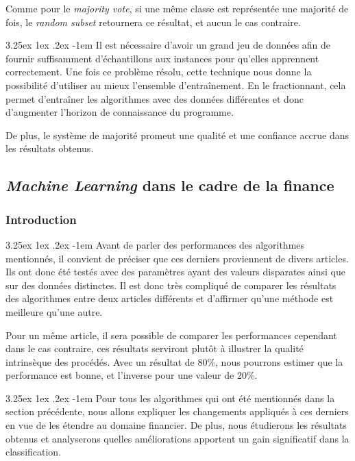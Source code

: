 \documentclass[a4paper, 11pt]{article}
\makeatletter
\renewcommand\paragraph{\@startsection{paragraph}{5}{\z@}%
  {3.25ex \@plus1ex \@minus.2ex}%
  {-1em}%
  {\normalfont\normalsize\bfseries}}
\makeatother
\begin{document}
Comme pour le \textit{majority vote}, si une même classe est représentée une majorité de fois, le \textit{random subset} retournera ce résultat, et aucun le cas contraire.

\paragraph{}
Il est nécessaire d'avoir un grand jeu de données afin de fournir suffisamment d'échantillons aux instances pour qu'elles
apprennent correctement.
Une fois ce problème résolu, cette technique nous donne la possibilité d'utiliser au mieux l'ensemble d'entraînement.
En le fractionnant, cela permet d'entraîner les algorithmes avec des données différentes et donc d'augmenter
l'horizon de connaissance du programme.

De plus, le système de majorité promeut une qualité et une confiance accrue dans les résultats obtenus.


\subsection{\textit{Machine Learning} dans le cadre de la finance}\label{section machine learning finance}
\subsubsection{Introduction}
\paragraph{}
Avant de parler des performances des algorithmes mentionnés, il convient de préciser que ces derniers proviennent
de divers articles. Ils ont donc été testés avec des paramètres ayant des valeurs disparates ainsi
que sur des données distinctes.
Il est donc très compliqué de comparer les résultats des algorithmes entre deux articles différents et
d'affirmer qu'une méthode est meilleure qu'une autre. 

Pour un même article, il sera possible de comparer les performances  cependant dans le cas contraire, ces
résultats serviront plutôt à illustrer la qualité intrinsèque des procédés. Avec un résultat de 80\%,
nous pourrons estimer que la performance est bonne, et l'inverse pour une valeur de 20\%.

\paragraph{}
Pour tous les algorithmes qui ont été mentionnés dans la section précédente, nous allons expliquer les changements
appliqués à ces derniers en vue de les étendre au domaine financier. De plus, nous étudierons les résultats obtenus
et analyserons quelles améliorations apportent un gain significatif dans la classification.
\end{document}
